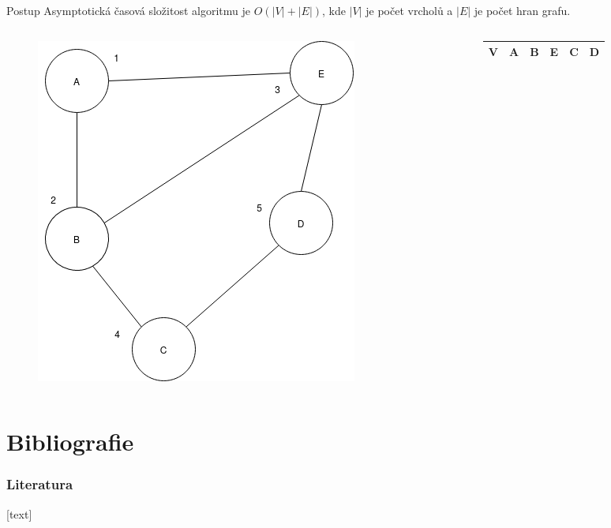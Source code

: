 \documentclass[hyperref={unicode}]{beamer}
\begin{document}
\begin{frame}
\begin{block}{Postup}
Asymptotická časová složitost algoritmu je $O(|V| + |E|)$, kde $|V|$ je počet vrcholů a $|E|$ je počet hran grafu\cite{complex}.
\end{block}
  \begin{columns}[T]
    \begin{column}{0.3\linewidth}
        \begin{figure}
        \includegraphics[width=\linewidth]{final_state.png}
        \end{figure}
    \end{column}
    \begin{column}{0.4\linewidth}
    \begin{table}[]
        \begin{tabular}{|l||l|l|l|l|l|}
        \hline
        V & A & B & E & C & D \\ \hline
        \end{tabular}
\end{table}
    \end{column}
  \end{columns}
\end{frame}






\section{Bibliografie}
\begin{frame}
\frametitle{Literatura}
[text]


\end{frame}
\end{document}
